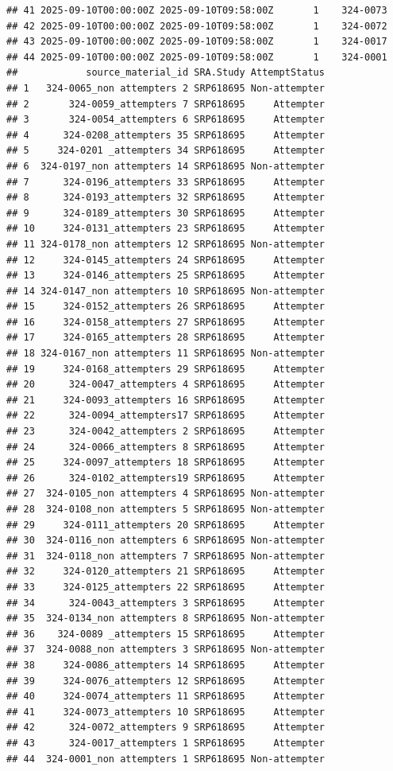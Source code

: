 \documentclass[
]{article}
\begin{document}
\begin{verbatim}
## 41 2025-09-10T00:00:00Z 2025-09-10T09:58:00Z       1    324-0073
## 42 2025-09-10T00:00:00Z 2025-09-10T09:58:00Z       1    324-0072
## 43 2025-09-10T00:00:00Z 2025-09-10T09:58:00Z       1    324-0017
## 44 2025-09-10T00:00:00Z 2025-09-10T09:58:00Z       1    324-0001
##            source_material_id SRA.Study AttemptStatus
## 1   324-0065_non attempters 2 SRP618695 Non-attempter
## 2       324-0059_attempters 7 SRP618695     Attempter
## 3       324-0054_attempters 6 SRP618695     Attempter
## 4      324-0208_attempters 35 SRP618695     Attempter
## 5     324-0201 _attempters 34 SRP618695     Attempter
## 6  324-0197_non attempters 14 SRP618695 Non-attempter
## 7      324-0196_attempters 33 SRP618695     Attempter
## 8      324-0193_attempters 32 SRP618695     Attempter
## 9      324-0189_attempters 30 SRP618695     Attempter
## 10     324-0131_attempters 23 SRP618695     Attempter
## 11 324-0178_non attempters 12 SRP618695 Non-attempter
## 12     324-0145_attempters 24 SRP618695     Attempter
## 13     324-0146_attempters 25 SRP618695     Attempter
## 14 324-0147_non attempters 10 SRP618695 Non-attempter
## 15     324-0152_attempters 26 SRP618695     Attempter
## 16     324-0158_attempters 27 SRP618695     Attempter
## 17     324-0165_attempters 28 SRP618695     Attempter
## 18 324-0167_non attempters 11 SRP618695 Non-attempter
## 19     324-0168_attempters 29 SRP618695     Attempter
## 20      324-0047_attempters 4 SRP618695     Attempter
## 21     324-0093_attempters 16 SRP618695     Attempter
## 22      324-0094_attempters17 SRP618695     Attempter
## 23      324-0042_attempters 2 SRP618695     Attempter
## 24      324-0066_attempters 8 SRP618695     Attempter
## 25     324-0097_attempters 18 SRP618695     Attempter
## 26      324-0102_attempters19 SRP618695     Attempter
## 27  324-0105_non attempters 4 SRP618695 Non-attempter
## 28  324-0108_non attempters 5 SRP618695 Non-attempter
## 29     324-0111_attempters 20 SRP618695     Attempter
## 30  324-0116_non attempters 6 SRP618695 Non-attempter
## 31  324-0118_non attempters 7 SRP618695 Non-attempter
## 32     324-0120_attempters 21 SRP618695     Attempter
## 33     324-0125_attempters 22 SRP618695     Attempter
## 34      324-0043_attempters 3 SRP618695     Attempter
## 35  324-0134_non attempters 8 SRP618695 Non-attempter
## 36    324-0089 _attempters 15 SRP618695     Attempter
## 37  324-0088_non attempters 3 SRP618695 Non-attempter
## 38     324-0086_attempters 14 SRP618695     Attempter
## 39     324-0076_attempters 12 SRP618695     Attempter
## 40     324-0074_attempters 11 SRP618695     Attempter
## 41     324-0073_attempters 10 SRP618695     Attempter
## 42      324-0072_attempters 9 SRP618695     Attempter
## 43      324-0017_attempters 1 SRP618695     Attempter
## 44  324-0001_non attempters 1 SRP618695 Non-attempter
\end{verbatim}
\end{document}
